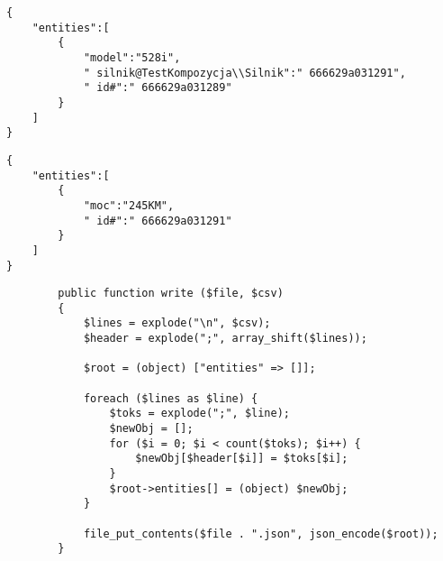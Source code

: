 \begin{empty}
	\begin{verbatim}
{
	"entities":[
		{
			"model":"528i",
			" silnik@TestKompozycja\\Silnik":" 666629a031291",
			" id#":" 666629a031289"
		}
	]
}
	\end{verbatim}
	\vspace{-10pt}
\end{empty}

\begin{empty}
	\begin{verbatim}
{
	"entities":[
		{
			"moc":"245KM",
			" id#":" 666629a031291"
		}
	]
}
	\end{verbatim}
	\vspace{-10pt}
\end{empty}

\begin{empty}
	\begin{verbatim}
		public function write ($file, $csv)
		{
			$lines = explode("\n", $csv);
			$header = explode(";", array_shift($lines));
			
			$root = (object) ["entities" => []];
			
			foreach ($lines as $line) {
				$toks = explode(";", $line);
				$newObj = [];
				for ($i = 0; $i < count($toks); $i++) {
					$newObj[$header[$i]] = $toks[$i];
				}
				$root->entities[] = (object) $newObj;
			}
			
			file_put_contents($file . ".json", json_encode($root));
		}
	\end{verbatim}
	\vspace{-10pt}
\end{empty}

